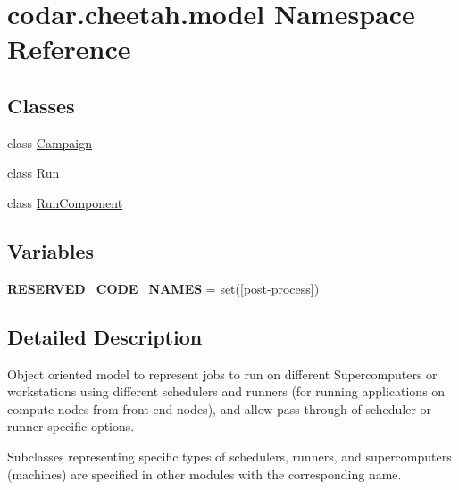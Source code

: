 \hypertarget{namespacecodar_1_1cheetah_1_1model}{}\section{codar.\+cheetah.\+model Namespace Reference}
\label{namespacecodar_1_1cheetah_1_1model}
\subsection*{Classes}
\begin{DoxyCompactItemize}
\item 
class \hyperlink{classcodar_1_1cheetah_1_1model_1_1_campaign}{Campaign}
\item 
class \hyperlink{classcodar_1_1cheetah_1_1model_1_1_run}{Run}
\item 
class \hyperlink{classcodar_1_1cheetah_1_1model_1_1_run_component}{Run\+Component}
\end{DoxyCompactItemize}
\subsection*{Variables}
\begin{DoxyCompactItemize}
\item 
\mbox{\label{namespacecodar_1_1cheetah_1_1model_a7d8bea761417a3809aef433e77fd2887}} 
{\bfseries R\+E\+S\+E\+R\+V\+E\+D\+\_\+\+C\+O\+D\+E\+\_\+\+N\+A\+M\+ES} = set(\mbox{[}\textquotesingle{}post-\/process\textquotesingle{}\mbox{]})
\end{DoxyCompactItemize}


\subsection{Detailed Description}
\begin{DoxyVerb}Object oriented model to represent jobs to run on different Supercomputers or
workstations using different schedulers and runners (for running applications
on compute nodes from front end nodes), and allow pass through of scheduler
or runner specific options.

Subclasses representing specific types of schedulers, runners, and
supercomputers (machines) are specified in other modules with the corresponding
name.
\end{DoxyVerb}
 